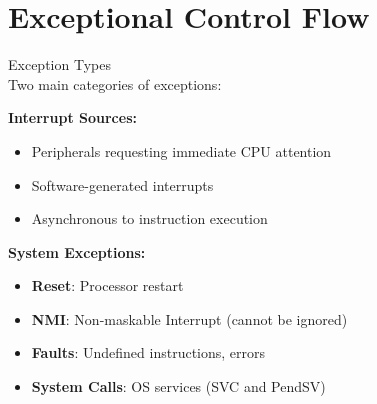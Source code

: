 \section{Exceptional Control Flow}

\begin{concept}{Exception Types}\\
Two main categories of exceptions:

\textbf{Interrupt Sources:}
\begin{itemize}
  \item Peripherals requesting immediate CPU attention
  \item Software-generated interrupts
  \item Asynchronous to instruction execution
\end{itemize}

\textbf{System Exceptions:}
\begin{itemize}
  \item \textbf{Reset}: Processor restart
  \item \textbf{NMI}: Non-maskable Interrupt (cannot be ignored)
  \item \textbf{Faults}: Undefined instructions, errors
  \item \textbf{System Calls}: OS services (SVC and PendSV)
\end{itemize}
\end{concept}

